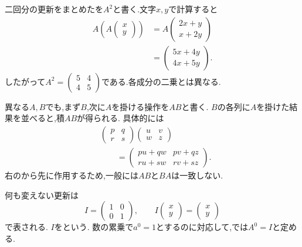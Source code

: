 二回分の更新をまとめたを$A^2$と書く.文字$x,y$で計算すると
\[
  \begin{aligned}
    A\left(A\begin{pmatrix}x\\y\end{pmatrix}\right)
    &=A\begin{pmatrix}2x+y\\x+2y\end{pmatrix}\\
    &=\begin{pmatrix}5x+4y\\4x+5y\end{pmatrix}.
  \end{aligned}
\]
したがって$A^2=\begin{pmatrix}5&4\\4&5\end{pmatrix}$である.各成分の二乗とは異なる.

異なる$A,B$でも,まず$B$,次に$A$を掛ける操作を$AB$と書く.
$B$の各列に$A$を掛けた結果を並べると,積$AB$が得られる.
具体的には
\[
  \begin{aligned}
    &\begin{pmatrix}p&q\\r&s\end{pmatrix}
     \begin{pmatrix}u&v\\w&z\end{pmatrix}\\
    &\qquad=
     \begin{pmatrix}
       pu+qw&pv+qz\\
       ru+sw&rv+sz
     \end{pmatrix}.
  \end{aligned}
\]
右のから先に作用するため,一般には$AB$と$BA$は一致しない.

何も変えない更新は
\[
  I=\begin{pmatrix}1&0\\0&1\end{pmatrix},
  \qquad
  I\begin{pmatrix}x\\y\end{pmatrix}
  =\begin{pmatrix}x\\y\end{pmatrix}
\]
で表される.
$I$を\textbf{}という.
数の累乗で$a^0=1$とするのに対応して,では$A^0=I$と定める.

